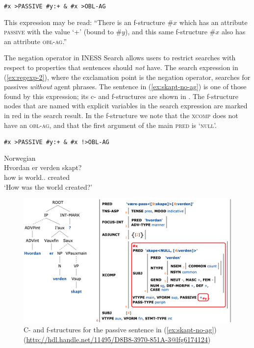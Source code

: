 \documentclass[output=paper,hidelinks]{langscibook}
\begin{document}

\ea
\label{ex:regexp-1} %
\texttt{\#x >PASSIVE \#y:\textquotesingle+\textquotesingle\ \& \#x >OBL-AG}
\z

This expression may be read: ``There is an f-structure $\#x$ which has an attribute \textsc{passive} with the value `\textsc +' (bound to $\#y$), and this same f-structure $\#x$ also has an attribute \textsc{obl-ag}.''

The negation operator in INESS Search allows users to restrict searches with respect to properties that sentences should \textit{not} have.
The search expression in (\ref{ex:regexp-2}), where the exclamation point is the negation operator, searches for passives \textit{without} agent phrases.
The sentence in (\ref{ex:skapt-no-ag}) is one of those found by this expression; its c- and f-structures are shown in .
The f-structure nodes that are named with explicit variables in the search expression are marked in red in the search result.
In the f-structure we note that the \textsc{xcomp} does not have an \textsc{obl-ag}, and that the first argument of the main \textsc{pred} is `\textsc{null}'.

\ea
\label{ex:regexp-2} %
\texttt{\#x >PASSIVE \#y:\textquotesingle+\textquotesingle\ \& \#x !>OBL-AG}
\z

\ea Norwegian  \\
\gll Hvordan er verden skapt?\\  
     how is {world.\DEF.\SG} created\\ 
\glt `How was the world created?'
\label{ex:skapt-no-ag}
\z

\begin{figure}
    \includegraphics[width=\textwidth]{figures/Treebanks/skapt-no-ag-2.png}
    \caption{C- and f-structures for the passive sentence in (\ref{ex:skapt-no-ag}) (\url{http://hdl.handle.net/11495/D8B8-3970-851A-3@lfg6174124})}
    \label{fig:skapt-no-ag}
\end{figure}
\end{document}
